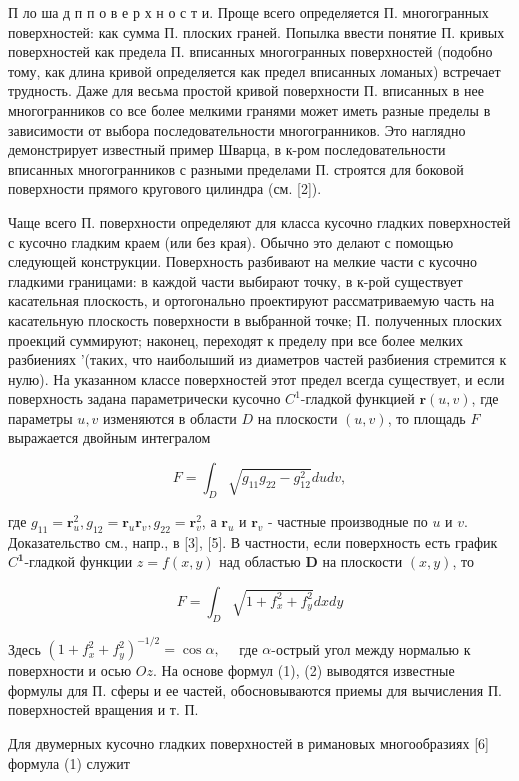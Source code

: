 \documentclass[10pt]{article}
\begin{document}
П ло ша д п п о в е р х н о с т и. Проще всего определяется П. многогранных поверхностей: как сумма П. плоских граней. Попылка ввести понятие П. кривых поверхностей как предела П. вписанных многогранных поверхностей (подобно тому, как длина кривой определяется как предел вписанных ломаных) встречает трудность. Даже для весьма простой кривой поверхности П. вписанных в нее многогранников со все более мелкими гранями может иметь разные пределы в зависимости от выбора последовательности многогранников. Это наглядно демонстрирует известный пример Шварца, в к-ром последовательности вписанных многогранников с разными пределами П. строятся для боковой поверхности прямого кругового цилиндра (см. [2]).



Чаще всего П. поверхности определяют для класса кусочно гладких поверхностей с кусочно гладким краем (или без края). Обычно это делают с помощью следующей конструкции. Поверхность разбивают на мелкие части с кусочно гладкими границами: в каждой части выбирают точку, в к-рой существует касательная плоскость, и ортогонально проектируют рассматриваемую часть на касательную плоскость поверхности в выбранной точке; П. полученных плоских проекций суммируют; наконец, переходят к пределу при все более мелких разбиениях '(таких, что наиболыший из диаметров частей разбиения стремится к нулю). На указанном классе поверхностей этот предел всегда существует, и если поверхность задана параметрически кусочно $C^{1}$-гладкой функцией $\boldsymbol{r}(u, v)$, где параметры $u, v$ изменяются в области $D$ на плоскости $(u, v)$, то площадь $F$ выражается двойным интегралом



\[

F=\int_{D} \sqrt{g_{11} g_{22}-g_{12}^{2}} d u d v,

\]



где $g_{11}=\boldsymbol{r}_{u}^{2}, g_{12}=\boldsymbol{r}_{u} \boldsymbol{r}_{v}, g_{22}=\boldsymbol{r}_{v}^{2}$, а $\boldsymbol{r}_{u}$ и $\boldsymbol{r}_{v}$ - частные производные по $u$ и $v$. Доказательство см., напр., в [3], [5]. В частности, если поверхность есть график $C^{\mathbf{1}}$-гладкой функции $z=f(x, y)$ над областью $\boldsymbol{D}$ на плоскости $(x, y)$, то



\[

F=\int_{D} \sqrt{1+f_{x}^{2}+f_{y}^{2}} d x d y

\]



Здесь $\left(1+f_{x}^{2}+f_{y}^{2}\right)^{-1 / 2}=\cos \alpha, \quad$ где $\alpha$-острый угол между нормалью к поверхности и осью $O z$. На основе формул (1), (2) выводятся известные формулы для П. сферы и ее частей, обосновываются приемы для вычисления П. поверхностей вращения и т. П.



Для двумерных кусочно гладких поверхностей в римановых многообразиях [6] формула (1) служит
\end{document}
